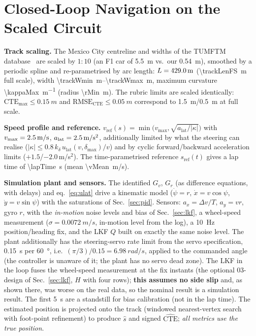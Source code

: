\documentclass[conference]{IEEEtran}
\begin{document}
\section{Closed-Loop Navigation on the Scaled Circuit}\label{sec:nav}
\textbf{Track scaling.} The Mexico City centreline and widths of the TUMFTM database~\cite{heilmeier2020} are scaled by $1{:}10$ (an F1 car of \SI{5.5}{m} vs.\ our \SI{0.54}{m}), smoothed by a periodic spline and re-parametrised by arc length: $L=\SI{429.0}{m}$ (\SI{\trackLenFS}{m} full scale), width \SIrange{\trackWmin}{\trackWmax}{m}, maximum curvature \SI{\kappaMax}{m^{-1}} (radius \SI{\rMin}{m}). The rubric limits are scaled identically: $\mathrm{CTE}_{\max}\le\SI{0.15}{m}$ and $\mathrm{RMSE}_\mathrm{CTE}\le\SI{0.05}{m}$ correspond to \SI{1.5}{m}/\SI{0.5}{m} at full scale.

\textbf{Speed profile and reference.} $v_\mathrm{ref}(s)=\min\big(v_\mathrm{max},\sqrt{a_\mathrm{lat}/|\kappa|}\big)$ with $v_\mathrm{max}=\SI{2.5}{m/s}$, $a_\mathrm{lat}=\SI{2.5}{m/s^2}$, additionally limited by what the steering can realise ($|\kappa|\le0.8\,k_\delta\,u_\mathrm{lat}(v,\delta_{\max})/v$) and by cyclic forward/backward acceleration limits ($+1.5$/$-2.0$\,m/s$^2$). The time-parametrised reference $s_\mathrm{ref}(t)$ gives a lap time of \SI{\lapTime}{s} (mean \SI{\vMean}{m/s}).

\textbf{Simulation plant and sensors.} The identified $G_v$, $G_r$ (as difference equations, with delays) and eq.~\eqref{eq:ulat} drive a kinematic model ($\dot\psi=r$, $\dot x=v\cos\psi$, $\dot y=v\sin\psi$) with the saturations of Sec.~\ref{sec:pid}. Sensors: $a_x=\Delta v/T$, $a_y=vr$, gyro $r$, with the \emph{in-motion} noise levels and bias of Sec.~\ref{sec:lkf}, a wheel-speed measurement ($\sigma=\SI{0.0072}{m/s}$, in-motion level from the log), a \SI{10}{Hz} position/heading fix, and the LKF $Q$ built on exactly the same noise level. The plant additionally has the steering-servo rate limit from the servo specification, \SI{0.15}{s} per \SI{60}{\degree}, i.e.\ $(\pi/3)/0.15=\SI{6.98}{rad/s}$, applied to the commanded angle (the controller is unaware of it; the plant has no servo dead zone). The LKF in the loop fuses the wheel-speed measurement at the fix instants (the optional 03-design of Sec.~\ref{sec:lkf}, $H$ with four rows); \textbf{this assumes no side slip} and, as shown there, was worse on the real data, so the nominal result is a simulation result. The first \SI{5}{s} are a standstill for bias calibration (not in the lap time). The estimated position is projected onto the track (windowed nearest-vertex search with foot-point refinement) to produce $\hat s$ and signed $\widehat{\mathrm{CTE}}$; \emph{all metrics use the true position}.
\end{document}
